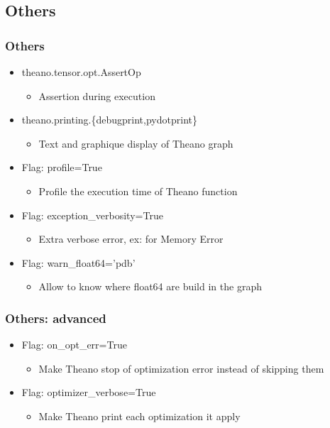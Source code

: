 \documentclass[utf8x,xcolor=pdftex,dvipsnames,table]{beamer}
\begin{document}
\subsection{Others}
\begin{frame}
  \frametitle{Others}
  \begin{itemize}
  \item theano.tensor.opt.AssertOp
    \begin{itemize}
    \item Assertion during execution
    \end{itemize}
  \item theano.printing.\{debugprint,pydotprint\}
    \begin{itemize}
    \item Text and graphique display of Theano graph
    \end{itemize}
  \item Flag: profile=True
    \begin{itemize}
    \item Profile the execution time of Theano function
    \end{itemize}
  \item Flag: exception\_verbosity=True
    \begin{itemize}
    \item Extra verbose error, ex: for Memory Error
    \end{itemize}
  \item Flag: warn\_float64='pdb'
    \begin{itemize}
    \item  Allow to know where float64 are build in the graph
    \end{itemize}
  \end{itemize}
\end{frame}

\begin{frame}
  \frametitle{Others: advanced}
  \begin{itemize}
  \item Flag: on\_opt\_err=True
    \begin{itemize}
    \item Make Theano stop of optimization error instead of skipping them
    \end{itemize}
  \item Flag: optimizer\_verbose=True
    \begin{itemize}
    \item Make Theano print each optimization it apply
    \end{itemize}
  \end{itemize}
\end{frame}
\end{document}
